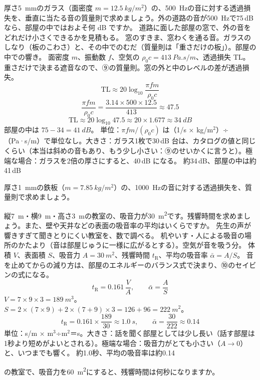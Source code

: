 \begin{phreidai}[窓ガラスの遮音]
\label{ph:波-9:ex13}厚さ\qty{5}{mm}のガラス（面密度 $m=\qty{12.5}{kg/m^2}$）の、\qty{500}{Hz}の音に対する透過損失を、垂直に当たる音の質量則で求めましょう。外の道路の音が\qty{500}{Hz}で75\,dB なら、部屋の中ではおよそ何 dB ですか。
\phbamen
道路に面した部屋の窓で、外の音をどれだけ小さくできるかを見積もる。
\phmushi
窓のすきま、窓わくを通る音。ガラスのしなり（板のこわさ）と、その中でのむだ（質量則は「重さだけの板」）。部屋の中での響き。
\phzu
面密度 $m$、振動数 $f$、空気の $\rho_0c=\qty{413}{Pa.s/m}$、透過損失 TL。
\phriyu
重さだけで決まる遮音なので、⑨の質量則。窓の外と中のレベルの差が透過損失。
\phtateru
\[ \mathrm{TL}\approx20\log_{10}\frac{\pi fm}{\rho_0c} \]
\phtoku
\[ \frac{\pi fm}{\rho_0c}=\frac{3.14\times500\times12.5}{413}\approx47.5 \]
\[ \mathrm{TL}\approx20\log_{10}47.5\approx20\times1.677\approx\qty{34}{dB} \]
部屋の中は $75-34=\qty{41}{dB}$。
\phtashikame
単位：$\pi fm/(\rho_0c)$ は（1/s × kg/m$^2$）÷（Pa·s/m）で単位なし。大きさ：ガラス1枚で30\,dB 台は、カタログの値と同じくらい（本当は斜めの音もあり、もう少し小さい：⑨のせいかくに言うと）。極端な場合：ガラスを2倍の厚さにすると、40\,dB になる。
\kotae 約34\,dB、部屋の中は約41\,dB
\end{phreidai}
\begin{jibun}
厚さ\qty{1}{mm}の鉄板（$m=\qty{7.85}{kg/m^2}$）の、\qty{1000}{Hz}の音に対する透過損失を、質量則で求めましょう。
\end{jibun}

\begin{phreidai}[教室の残響時間]
\label{ph:波-9:ex14}縦\qty{7}{m}・横\qty{9}{m}・高さ\qty{3}{m}の教室の、吸音力が\qty{30}{m^2}です。残響時間を求めましょう。また、壁や天井などの表面の吸音率の平均はいくらですか。
\phbamen
先生の声が響きすぎて聞きとりにくい教室を、数で調べる。
\phmushi
机やいす・人による吸音の場所のかたより（音は部屋じゅうに一様に広がるとする）。空気が音を吸う分。
\phzu
体積 $V$、表面積 $S$、吸音力 $A=\qty{30}{m^2}$、残響時間 $t_{\mathrm R}$、平均の吸音率 $\bar\alpha=A/S$。
\phriyu
音を止めてからの減り方は、部屋のエネルギーのバランス式で決まり、⑩のセイビンの式になる。
\phtateru
\[ t_{\mathrm R}=0.161\,\frac{V}{A},\qquad \bar\alpha=\frac{A}{S} \]
\phtoku
$V=7\times9\times3=\qty{189}{m^3}$。$S=2\times(7\times9)+2\times(7+9)\times3=126+96=\qty{222}{m^2}$。
\[ t_{\mathrm R}=0.161\times\frac{189}{30}\approx\qty{1.0}{s},\qquad \bar\alpha=\frac{30}{222}\approx0.14 \]
\phtashikame
単位：s/m × m$^3$÷m$^2$＝s。大きさ：話を聞く部屋としては少し長い（話す部屋は1秒より短めがよいとされる）。極端な場合：吸音力がとても小さい（$A\to0$）と、いつまでも響く。
\kotae 約1.0秒、平均の吸音率は約0.14
\end{phreidai}
\begin{jibun}
の教室で、吸音力を\qty{60}{m^2}にすると、残響時間は何秒になりますか。
\end{jibun}


